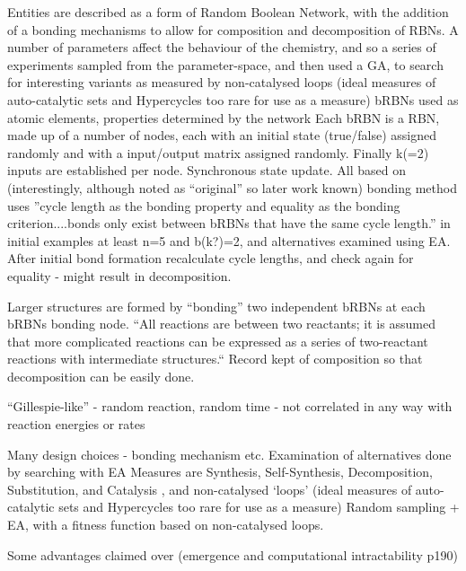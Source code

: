 Entities are described as a form of Random Boolean Network, with the addition of a bonding mechanisms to allow for composition and decomposition of RBNs. A number of parameters affect the behaviour of the chemistry, and so a series of experiments sampled from the parameter-space, and then used a GA, to search for interesting variants as measured by non-catalysed loops (ideal measures of auto-catalytic sets and Hypercycles too rare for use as a measure) \parencite[chap.8]{Faulconbridge2011}
bRBNs used as atomic elements, properties determined by the network
Each bRBN is a RBN, made up of a number of nodes, each with an initial state (true/false) assigned randomly and with a input/output matrix assigned randomly. Finally k(=2) inputs are established per node. Synchronous state update. All based on \cite{Kauffman:1969ne} (interestingly, although noted as ``original'' so later work known) bonding method uses ''cycle length as the bonding property and equality as the bonding criterion....bonds only exist between bRBNs that have the same cycle length.'' in initial examples at least n=5 and b(k?)=2, and alternatives examined using EA. After initial bond formation recalculate cycle lengths, and check again for equality - might result in decomposition.

Larger structures are formed by ``bonding'' two independent bRBNs at each bRBNs bonding node. ``All reactions are between two reactants; it is assumed that more complicated reactions can be expressed as a series of two-reactant reactions with intermediate structures.`` Record kept of composition so that decomposition can be easily done.

``Gillespie-like'' - random reaction, random time - not correlated in any way with reaction energies or rates \parencite[chap.8]{Faulconbridge2011}

Many design choices - bonding mechanism etc. Examination of alternatives done by searching with EA
Measures are Synthesis, Self-Synthesis, Decomposition, Substitution, and Catalysis \parencite[chap.7]{Faulconbridge2011}, and non-catalysed `loops' (ideal measures of auto-catalytic sets and Hypercycles too rare for use as a measure) \parencite[chap.8]{Faulconbridge2011}
Random sampling + EA, with a fitness function based on non-catalysed loops.

Some advantages claimed over \cite{Hutton2007} (emergence and computational intractability p190)

